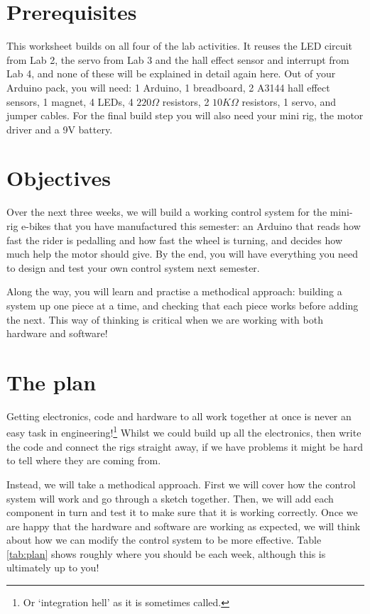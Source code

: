 \documentclass[11pt,a4paper]{article}
\begin{document}
\pagestyle{fancy}

\section*{Prerequisites}
This worksheet builds on all four of the lab activities. It reuses the LED circuit from Lab 2, the servo from Lab 3 and the hall effect sensor and interrupt from Lab 4, and none of these will be explained in detail again here. Out of your Arduino pack, you will need: 1 Arduino, 1 breadboard, 2 A3144 hall effect sensors, 1 magnet, 4 LEDs, 4 $220\Omega$ resistors, 2 $10K\Omega$ resistors, 1 servo, and jumper cables. For the final build step you will also need your mini rig, the motor driver and a 9V battery.

\section*{Objectives}
Over the next three weeks, we will build a working control system for the mini-rig e-bikes that you have manufactured this semester: an Arduino that reads how fast the rider is pedalling and how fast the wheel is turning, and decides how much help the motor should give. By the end, you will have everything you need to design and test your own control system next semester.

Along the way, you will learn and practise a methodical approach: building a system up one piece at a time, and checking that each piece works before adding the next. This way of thinking is critical when we are working with both hardware and software!

\section*{The plan}
Getting electronics, code and hardware to all work together at once is never an easy task in engineering!\footnote{Or `integration hell' as it is sometimes called.} Whilst we could build up all the electronics, then write the code and connect the rigs straight away, if we have problems it might be hard to tell where they are coming from.

Instead, we will take a methodical approach. First we will cover how the control system will work and go through a sketch together. Then, we will add each component in turn and test it to make sure that it is working correctly. Once we are happy that the hardware and software are working as expected, we will think about how we can modify the control system to be more effective. Table \ref{tab:plan} shows roughly where you should be each week, although this is ultimately up to you!
\end{document}
